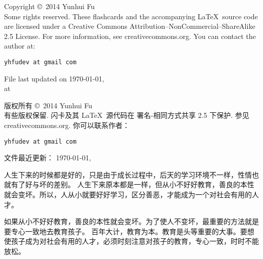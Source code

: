 \documentclass[avery5371,grid]{flashcards}
\begin{document}
\begin{flashcard}{Copyright \copyright \, 2014 Yunhui Fu\\
Some rights reserved.}
These flashcards and the accompanying \LaTeX \, source code are licensed
under a Creative Commons Attribution--NonCommercial--ShareAlike 2.5 License.  
For more information, see creativecommons.org.  You can contact the author at:
\begin{center}
\begin{small}\tt yhfudev at gmail com\end{small}

\medskip
File last updated on \today, \\
at \currenttime
\end{center}
\end{flashcard}

\begin{flashcard}[版权申明]{版权所有 \copyright \, 2014 Yunhui Fu\\
有些版权保留.}
闪卡及其 \LaTeX \, 源代码在
署名-相同方式共享 2.5 下保护.
参见 creativecommons.org.  你可以联系作者：
\begin{center}
\begin{small}\tt yhfudev at gmail com\end{small}

\medskip
文件最近更新： \today, \\
\currenttime
\end{center}
\end{flashcard}





{人生下来的时候都是好的，只是由于成长过程中，后天的学习环境不一样，性情也就有了好与坏的差别。} %
{人生下来原本都是一样，但从小不好好教育，善良的本性就会变坏。所以，人从小就要好好学习，区分善恶，才能成为一个对社会有用的人才。} %

{如果从小不好好教育，善良的本性就会变坏。为了使人不变坏，最重要的方法就是要专心一致地去教育孩子。} %
{百年大计，教育为本。教育是头等重要的大事。要想使孩子成为对社会有用的人才，必须时刻注意对孩子的教育，专心一致，时时不能放松。} %
\end{document}
